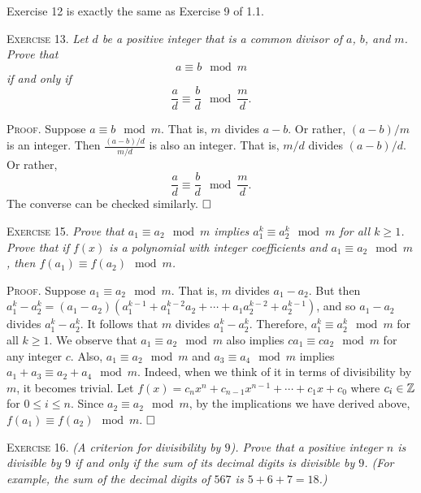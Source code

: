 \documentclass[11pt, leqno]{article}
\newcommand{\done}{\ensuremath{\hfill\square}}
\begin{document}
Exercise 12 is exactly the same as Exercise 9 of 1.1.

\textsc{Exercise 13}. \emph{Let $d$ be a positive integer that is a common divisor of $a$, $b$, and $m$. Prove that 
\begin{displaymath}
a \equiv b \mod m
\end{displaymath} if and only if 
\begin{displaymath}
\frac{a}{d} \equiv \frac{b}{d} \mod \frac{m}{d}.
\end{displaymath}}

\textsc{Proof}. Suppose $a \equiv b \mod m$. That is, $m$ divides $a-b$. Or rather, $(a-b)/m$ is an integer. Then $\frac{(a-b)/d}{m/d}$ is also an integer. That is, $m/d$ divides $(a-b)/d$. Or rather, 
\begin{displaymath}
\frac{a}{d} \equiv \frac{b}{d} \mod \frac{m}{d}.
\end{displaymath}
The converse can be checked similarly. \done

\textsc{Exercise 15}. \emph{Prove that $a_1 \equiv a_2 \mod m$ implies $a_1^k \equiv a_2^k \mod m$ for all $k \geq 1$. Prove that if $f(x)$ is a polynomial with integer coefficients and $a_1 \equiv a_2 \mod m$, then $f(a_1) \equiv f(a_2) \mod m$.}

\textsc{Proof}. Suppose $a_1 \equiv a_2 \mod m$. That is, $m$ divides $a_1 - a_2$. But then $a_1^k - a_2^k = (a_1 - a_2)(a_1^{k-1} + a_1^{k-2}a_2 + \cdots + a_1a_2^{k-2} + a_2^{k-1})$, and so $a_1 - a_2$ divides $a_1^k - a_2^k$. It follows that $m$ divides $a_1^k - a_2^k$. Therefore, $a_1^k \equiv a_2^k \mod m$ for all $k\geq 1$. We observe that $a_1 \equiv a_2 \mod m$ also implies $ca_1 \equiv ca_2 \mod m$ for any integer $c$. Also, $a_1 \equiv a_2 \mod m$ and $a_3 \equiv a_4 \mod m$ implies $a_1 + a_3 \equiv a_2 + a_4 \mod m$. Indeed, when we think of it in terms of divisibility by $m$, it becomes trivial. Let $f(x) = c_nx^n + c_{n-1}x^{n-1} + \cdots + c_1x + c_0$ where $c_i \in \mathbb{Z}$ for $0 \leq i \leq n$. Since $a_2 \equiv a_2 \mod m$, by the implications we have derived above, $f(a_1) \equiv f(a_2) \mod m$. \done

\textsc{Exercise 16}. \emph{(A criterion for divisibility by $9$). Prove that a positive integer $n$ is divisible by $9$ if and only if the sum of its decimal digits is divisible by $9$. (For example, the sum of the decimal digits of $567$ is $5+6+7 = 18$.)}
\end{document}
